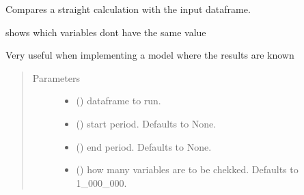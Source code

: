 \documentclass[letterpaper,10pt,english]{sphinxmanual}
\begin{document}
\begin{fulllineitems}
\begin{fulllineitems}
\label{\detokenize{core/modelclass:modelclass.Model_help_Mixin.test_model}}
\pysigstartsignatures
{}
\pysigstopsignatures
\sphinxAtStartPar
Compares a straight calculation with the input dataframe.

\sphinxAtStartPar
shows which variables dont have the same value

\sphinxAtStartPar
Very useful when implementing a model where the results are known
\begin{quote}\begin{description}
\item[{Parameters}] \leavevmode\begin{itemize}
\item {} 
\sphinxAtStartPar
{} () \textendash{} dataframe to run.

\item {} 
\sphinxAtStartPar
{} (\sphinxstyleliteralemphasis{\sphinxupquote{, }}) \textendash{} start period. Defaults to None.

\item {} 
\sphinxAtStartPar
{} (\sphinxstyleliteralemphasis{\sphinxupquote{, }}) \textendash{} end period. Defaults to None.

\item {} 
\sphinxAtStartPar
{} (\sphinxstyleliteralemphasis{\sphinxupquote{, }}) \textendash{} how many variables are to be chekked. Defaults to 1\_000\_000.


\end{itemize}
\end{description}
\end{quote}
\end{fulllineitems}
\end{fulllineitems}
\end{document}
